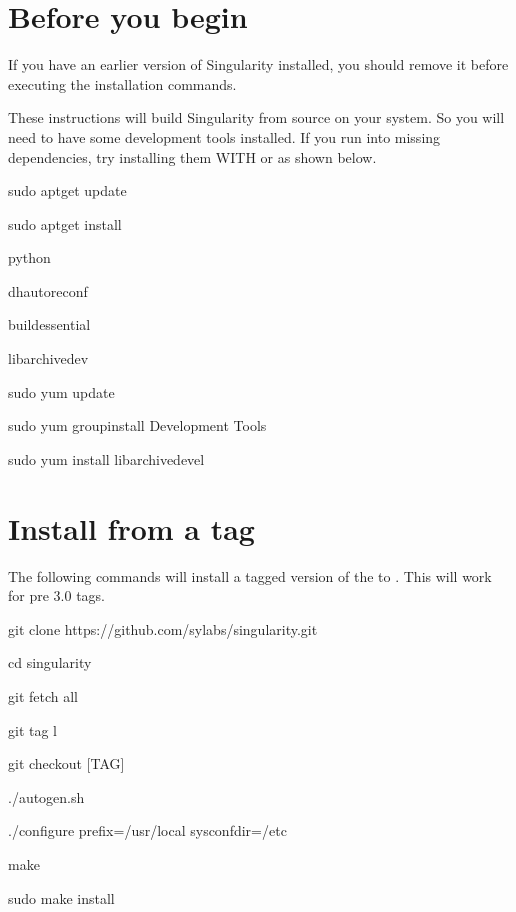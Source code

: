\documentclass[letterpaper,10pt,english]{sphinxmanual}
\begin{document}
\section{Before you begin}
\label{\detokenize{installation:before-you-begin}}
If you have an earlier version of Singularity installed, you should
remove it before executing the installation commands.

These instructions will build Singularity from source on your system.
So you will need to have some development tools installed. If you run
into missing dependencies, try installing them WITH  or  as shown below.

%
\begin{sphinxVerbatim}[commandchars=\\\{\}]
\PYGZdl{} sudo apt\PYGZhy{}get update \PYGZam{}\PYGZam{} \PYGZbs{}

    sudo apt\PYGZhy{}get install \PYGZbs{}

    python \PYGZbs{}

    dh\PYGZhy{}autoreconf \PYGZbs{}

    build\PYGZhy{}essential \PYGZbs{}

    libarchive\PYGZhy{}dev
\end{sphinxVerbatim}

%
\begin{sphinxVerbatim}[commandchars=\\\{\}]
\PYGZdl{} sudo yum update \PYGZam{}\PYGZam{} \PYGZbs{}

    sudo yum groupinstall \PYGZsq{}Development Tools\PYGZsq{} \PYGZam{}\PYGZam{} \PYGZbs{}

    sudo yum install libarchive\PYGZhy{}devel
\end{sphinxVerbatim}


\section{Install from a tag}
\label{\detokenize{installation:install-from-a-tag}}
The following commands will install a tagged version of the  to .
This will work for pre 3.0 tags.

%
\begin{sphinxVerbatim}[commandchars=\\\{\}]
\PYGZdl{} git clone https://github.com/sylabs/singularity.git

\PYGZdl{} cd singularity

\PYGZdl{} git fetch \PYGZhy{}\PYGZhy{}all

\PYGZdl{} git tag \PYGZhy{}l

\PYGZdl{} git checkout [TAG]

\PYGZdl{} ./autogen.sh

\PYGZdl{} ./configure \PYGZhy{}\PYGZhy{}prefix=/usr/local \PYGZhy{}\PYGZhy{}sysconfdir=/etc

\PYGZdl{} make

\PYGZdl{} sudo make install
\end{sphinxVerbatim}
\end{document}
